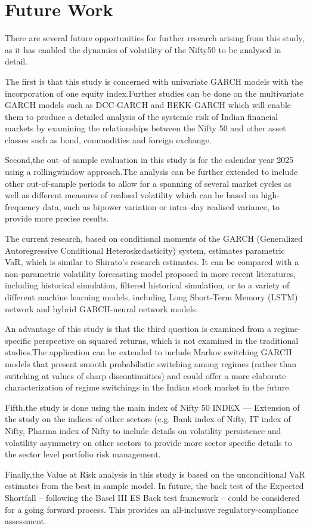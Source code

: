 \section{Future Work}


There are several future opportunities for further research arising from this study, as it has enabled the dynamics of volatility of the Nifty50 to be analysed in detail.


The first is that this study is concerned with univariate GARCH models with the incorporation of one equity index.Further studies can be done on the multivariate GARCH models such as DCC-GARCH\citep{Engle2002dcc} and BEKK-GARCH\citep{engle1995multivariate} which will enable them to produce a detailed analysis of the systemic risk of Indian financial markets by examining the relationships between the Nifty 50 and other asset classes such as bond, commodities and foreign exchange. 


Second,the out--of sample evaluation in this study is for the calendar year 2025 using a rollingwindow approach.The analysis can be further extended to include other out-of-sample periods to allow for a spanning of several market cycles as well as different measures of realised volatility which can be based on high-frequency data, such as bipower variation or intra--day realised variance, to provide more precise results.

The current research, based on conditional moments of the GARCH (Generalized Autoregressive Conditional Heteroskedasticity) system, estimates parametric VaR, which is similar to Shirato's research estimates. It can be compared with a non-parametric volatility forecasting model proposed in more recent literatures, including historical simulation, filtered historical simulation, or to a variety of different machine learning models, including Long Short-Term Memory (LSTM) network and hybrid GARCH-neural network models.


An advantage of this study is that the third question is examined from a regime-specific perspective on squared returns, which is not examined in the traditional studies.The application can be extended to include Markov switching GARCH models that present smooth probabilistic switching among regimes (rather than switching at values of sharp discontinuities) and could offer a more elaborate characterization of regime switchings in the Indian stock market in the future.





Fifth,the study is done using the main index of Nifty 50 INDEX --- Extension of the study on the indices of other sectors (e.g. Bank index of Nifty, IT index of Nifty, Pharma index of Nifty to include details on volatility persistence and volatility asymmetry on other sectors to provide more sector specific details to the sector level portfolio risk management. 


Finally,the Value at Risk analysis in this study is based on the unconditional VaR estimates from the best in sample model. In future, the back test of the Expected Shortfall -- following the Basel III  ES Back test framework -- could be considered for a going forward process. This provides an all-inclusive regulatory-compliance assessment.